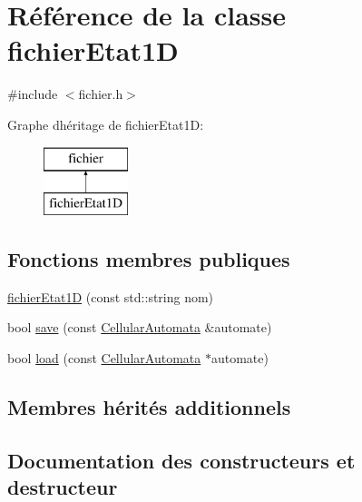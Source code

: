 \hypertarget{classfichier_etat1_d}{}\section{Référence de la classe fichier\+Etat1D}
\label{classfichier_etat1_d}


{\ttfamily \#include $<$fichier.\+h$>$}

Graphe d\textquotesingle{}héritage de fichier\+Etat1D\+:\begin{figure}[H]
\begin{center}
\leavevmode
\includegraphics[height=2.000000cm]{classfichier_etat1_d}
\end{center}
\end{figure}
\subsection*{Fonctions membres publiques}
\begin{DoxyCompactItemize}
\item 
\mbox{\hyperlink{classfichier_etat1_d_ac51077398acac276b0b8dd10dea2228e}{fichier\+Etat1D}} (const std\+::string nom)
\item 
bool \mbox{\hyperlink{classfichier_etat1_d_a120ee4b6234a18bdb88c5d60bd0ef5c0}{save}} (const \mbox{\hyperlink{class_cellular_automata}{Cellular\+Automata}} \&automate)
\item 
bool \mbox{\hyperlink{classfichier_etat1_d_a06c7ac08352e595eda7df415e50e66f8}{load}} (const \mbox{\hyperlink{class_cellular_automata}{Cellular\+Automata}} $\ast$automate)
\end{DoxyCompactItemize}
\subsection*{Membres hérités additionnels}


\subsection{Documentation des constructeurs et destructeur}
\mbox{\label{classfichier_etat1_d_ac51077398acac276b0b8dd10dea2228e}} 
